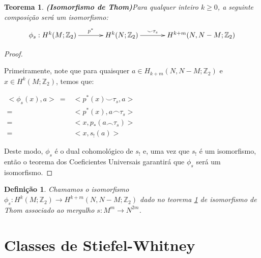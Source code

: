 \documentclass[12pt,oneside]{book} %
\newtheorem{defi}   {\hspace{0.5cm}Defini\c c\~ao}[chapter]
\newtheorem{teo}    {\hspace{0.5cm}Teorema}[chapter]
\newcommand{\Z}{\mathbb{Z}}
\newcommand{\ccup}{\smile}
\newcommand{\ccap}{\frown}
\begin{document}
\begin{teo}{\bf (Isomorfismo de Thom)}\label{iso_thom_vg}
	Para qualquer inteiro $k\geq 0$, a seguinte composição será um isomorfismo:
	$$ \xymatrix @C=0.5cm {
		\phi_{s}:H^{k}(M;\Z_{2}) \ar[rr]^-{p^{*}} && H^{k}(N;\Z_{2}) \ar[rr]^-{\ccup \tau_{s}} && H^{k+m}(N,N-M;\Z_{2})
	} $$
\end{teo}

\begin{proof}
	
	\
	
	\par Primeiramente, note que para quaisquer $a\in H_{k+m}(N,N-M;\Z_{2})$ e $x\in H^{k}(M;\Z_{2})$, temos que: \newline
	
	$ \begin{array}{rl}
		<\phi_{s}(x),a> \ = & <p^{*}(x)\ccup\tau_{s},a> \\
		= & <p^{*}(x),a\ccap\tau_{s}> \\
		= & <x,p_{*}(a\ccap\tau_{s})> \\
		= & <x,s_{!}(a)>
	\end{array} $\newline
	
	\par Deste modo, $\phi_{s}$ é o dual cohomológico de $s_{!}$ e, uma vez que $s_{!}$ é um isomorfismo, então o teorema dos Coeficientes Universais garantirá que $\phi_{s}$ será um isomorfismo.
	
\end{proof}

\begin{defi}
	Chamamos o isomorfismo $\phi_{s}:H^{k}(M;\Z_{2})\to H^{k+m}(N,N-M;\Z_{2})$ dado no teorema \ref{iso_thom_vg} de isomorfismo de Thom associado ao mergulho $s:M^{m}\to N^{2m}$.
\end{defi}






\section{Classes de Stiefel-Whitney}\label{sec_SW_gen}
\end{document}
